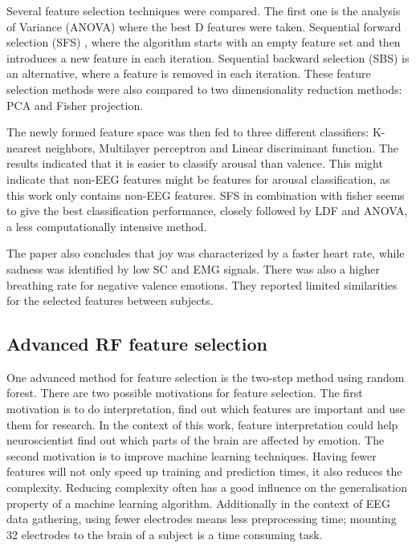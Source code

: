 \npar 

Several feature selection techniques were compared. The first one is the analysis of Variance (ANOVA)  where the best D features were taken. Sequential forward selection (SFS) , where the algorithm starts with an empty feature set and then introduces a new feature in each iteration. Sequential backward selection (SBS)  is an alternative, where a feature is removed in each iteration. These feature selection methods were also compared to two dimensionality reduction methods: PCA and Fisher projection. 

\npar

The newly formed feature space was then fed to three different classifiers: K-nearest neighbors, Multilayer perceptron and Linear discriminant function. The results indicated that it is easier to classify arousal than valence. This might indicate that non-EEG features might be features for arousal classification, as this work only contains non-EEG features. SFS in combination with fisher seems to give the best classification performance, closely followed by LDF and ANOVA, a less computationally intensive method.

\npar

The paper also concludes that joy was characterized by a faster heart rate, while sadness was identified by low SC and EMG signals. There was also a higher breathing rate for negative valence emotions. They reported limited similarities for the selected features between subjects.

\subsection{Advanced RF feature selection}
\label{rfmethod}
One advanced method for feature selection is the two-step method using random forest\citep{rfPaper}. There are two possible motivations for feature selection. The first motivation is to do interpretation, find out which features are important and use them for research. In the context of this work, feature interpretation could help neuroscientist find out which parts of the brain are affected by emotion. The second motivation is to improve machine learning techniques. Having fewer features will not only speed up training and prediction times, it also reduces the complexity. Reducing complexity often has a good influence on the generalisation property of a machine learning algorithm\citep{prml,rfPaper}. Additionally in the context of EEG data gathering, using fewer electrodes means less preprocessing time; mounting 32 electrodes to the brain of a subject is a time consuming task.

